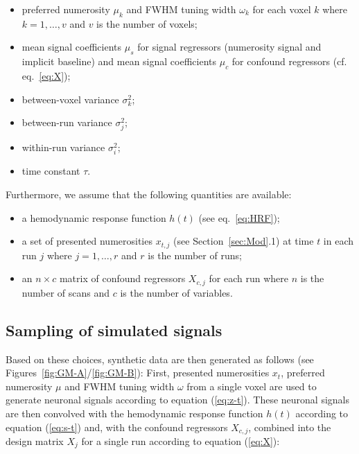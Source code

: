 \documentclass[a4paper,12pt]{article}
\begin{document}
\begin{itemize}
	
\item preferred numerosity $\mu_k$ and FWHM tuning width $\omega_k$ for each voxel $k$ where $k = 1,\ldots,v$ and $v$ is the number of voxels;

\item mean signal coefficients $\mu_s$ for signal regressors (numerosity signal and implicit baseline) and mean signal coefficients $\mu_c$ for confound regressors (cf. eq.~\ref{eq:X});

\item between-voxel variance $\sigma_k^2$;

\item between-run variance $\sigma_j^2$;

\item within-run variance $\sigma_i^2$;

\item time constant $\tau$.

\end{itemize}

Furthermore, we assume that the following quantities are available:

\begin{itemize}

\item a hemodynamic response function $h(t)$ (see eq.~\ref{eq:HRF});

\item a set of presented numerosities $x_{t,j}$ (see Section~\ref{sec:Mod}.1) at time $t$ in each run $j$ where $j = 1,\ldots,r$ and $r$ is the number of runs;

\item an $n \times c$ matrix of confound regressors $X_{c,j}$ for each run where $n$ is the number of scans and $c$ is the number of variables.
	
\end{itemize}


\subsection{Sampling of simulated signals}

Based on these choices, synthetic data are then generated as follows (see Figures~\ref{fig:GM-A}/\ref{fig:GM-B}): First, presented numerosities $x_t$, preferred numerosity $\mu$ and FWHM tuning width $\omega$ from a single voxel are used to generate neuronal signals according to equation (\ref{eq:z-t}). These neuronal signals are then convolved with the hemodynamic response function $h(t)$ according to equation (\ref{eq:s-t}) and, with the confound regressors $X_{c,j}$, combined into the design matrix $X_j$ for a single run according to equation (\ref{eq:X}):
\end{document}
